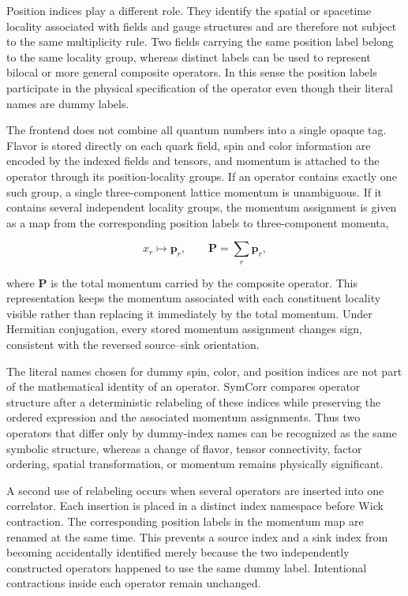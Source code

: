 \documentclass[11pt]{article}
\begin{document}
Position indices play a different role. They identify the spatial or spacetime
locality associated with fields and gauge structures and are therefore not
subject to the same multiplicity rule. Two fields carrying the same position
label belong to the same locality group, whereas distinct labels can be used to
represent bilocal or more general composite operators. In this sense the
position labels participate in the physical specification of the operator even
though their literal names are dummy labels.

The frontend does not combine all quantum numbers into a single opaque tag.
Flavor is stored directly on each quark field, spin and color information are
encoded by the indexed fields and tensors, and momentum is attached to the
operator through its position-locality groups. If an operator contains exactly
one such group, a single three-component lattice momentum is unambiguous. If it
contains several independent locality groups, the momentum assignment is given
as a map from the corresponding position labels to three-component momenta,

\begin{equation}
 x_r \longmapsto \mathbf p_r,
 \qquad
 \mathbf P = \sum_r \mathbf p_r ,
\label{eq:operator_momentum_groups}
\end{equation}

where \(\mathbf P\) is the total momentum carried by the composite operator.
This representation keeps the momentum associated with each constituent
locality visible rather than replacing it immediately by the total momentum.
Under Hermitian conjugation, every stored momentum assignment changes sign,
consistent with the reversed source--sink orientation.

The literal names chosen for dummy spin, color, and position indices are not
part of the mathematical identity of an operator. SymCorr compares operator
structure after a deterministic relabeling of these indices while preserving
the ordered expression and the associated momentum assignments. Thus two
operators that differ only by dummy-index names can be recognized as the same
symbolic structure, whereas a change of flavor, tensor connectivity, factor
ordering, spatial transformation, or momentum remains physically significant.

A second use of relabeling occurs when several operators are inserted into one
correlator. Each insertion is placed in a distinct index namespace before Wick
contraction. The corresponding position labels in the momentum map are renamed
at the same time. This prevents a source index and a sink index from becoming
accidentally identified merely because the two independently constructed
operators happened to use the same dummy label. Intentional contractions
inside each operator remain unchanged.
\end{document}
